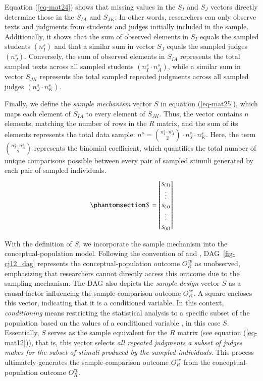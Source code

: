 \documentclass[
  authoryear,
  review,
  1p]{elsarticle}
\begin{document}
Equation (\ref{eq-mat24}) shows that missing values in the \(S_{I}\) and
\(S_{J}\) vectors directly determine those in the \(S_{IA}\) and
\(S_{JK}\). In other words, researchers can only observe texts and
judgments from students and judges initially included in the sample.
Additionally, it shows that the sum of observed elements in \(S_{I}\)
equals the sampled students \((n^{s}_{I})\) and that a similar sum in
vector \(S_{J}\) equals the sampled judges \((n^{s}_{J})\). Conversely,
the sum of observed elements in \(S_{IA}\) represents the total sampled
texts across all sampled students \((n^{s}_{I} \cdot n^{s}_{A})\), while
a similar sum in vector \(S_{JK}\) represents the total sampled repeated
judgments across all sampled judges \((n^{s}_{J} \cdot n^{s}_{K})\).

Finally, we define the \emph{sample mechanism} vector \(S\) in equation
(\ref{eq-mat25}), which maps each element of \(S_{IA}\) to every element
of \(S_{JK}\). Thus, the vector contains \(n\) elements, matching the
number of rows in the \(R\) matrix, and the sum of its elements
represents the total data sample:
\(n^{s} = \binom{n^{s}_{I} \cdot n^{s}_{A}}{2} \cdot n^{s}_{J} \cdot n^{s}_{K}\).
Here, the term \({n^{s}_{I} \cdot n^{s}_{A} \choose 2}\) represents the
binomial coefficient, which quantifies the total number of unique
comparisons possible between every pair of sampled stimuli generated by
each pair of sampled individuals.
\begin{equation}\phantomsection\label{eq-mat25}{
S = \begin{bmatrix}
s_{(1)} \\
\vdots \\
s_{(s)} \\
\vdots \\
s_{(n)} \\
\end{bmatrix}
}\end{equation}

With the definition of \(S\), we incorporate the sample mechanism into
the conceptual-population model. Following the convention of
\citet[pp.~499-516]{McElreath_2020} and
\citet[pp.~6]{Deffner_et_al_2022}, DAG~\ref{fig-cj12_dag} represents the
conceptual-population outcome \(O^{cp}_{R}\) as unobserved, emphasizing
that researchers cannot directly access this outcome due to the sampling
mechanism. The DAG also depicts the \emph{sample design} vector \(S\) as
a causal factor influencing the sample-comparison outcome
\(O^{sc}_{R}\). A square encloses this vector, indicating that it is a
conditioned variable. In this context, \emph{conditioning} means
restricting the statistical analysis to a specific subset of the
population based on the values of a conditioned variable
\citep[pp.~32]{Neal_2020}, in this case \(S\). Essentially, \(S\) serves
as the sample equivalent for the \(R\) matrix (see equation
(\ref{eq-mat12})), that is, this vector selects \emph{all repeated
judgments a subset of judges makes for the subset of stimuli produced by
the sampled individuals}. This process ultimately generates the
sample-comparison outcome \(O^{sc}_{R}\) from the conceptual-population
outcome \(O^{cp}_{R}\).
\end{document}
